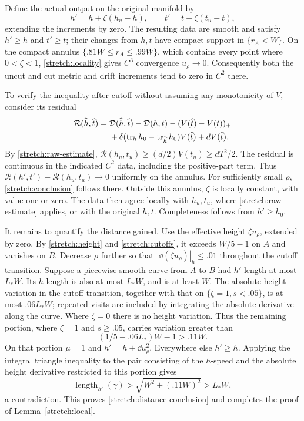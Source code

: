Define the actual output on the original manifold by
\begin{equation}\label{stretch:output}
 h'=h+\zeta(h_u-h),\qquad t'=t+\zeta(t_u-t),
\end{equation}
extending the increments by zero.  The resulting data are smooth and
satisfy $h'\ge h$ and $t'\ge t$; their changes from $h,t$ have compact
support in $\{r_A<W\}$.
On the compact annulus
$\{.81W\le r_A\le.99W\}$, which contains every point where
$0<\zeta<1$, \eqref{stretch:locality} gives $C^3$ convergence
$u_\rho\to0$.  Consequently both the uncut and cut metric and drift
increments tend to zero in $C^2$ there.

To verify the inequality after cutoff without assuming any monotonicity
of $V$, consider its residual
\[
 \begin{split}
 \mathcal R(\widehat h,\widehat t)={}&
 \mathcal D(\widehat h,\widehat t)-\mathcal D(h,t)
                         -(V(\widehat t)-V(t))_+\\
 &+\delta(\operatorname{tr}_hh_0-\operatorname{tr}_{\widehat h}h_0)V(\widehat t)
                                      +dV(\widehat t).
 \end{split}
\]
By \eqref{stretch:raw-estimate},
$\mathcal R(h_u,t_u)\ge(d/2)V(t_u)\ge dT^2/2$.
The residual is continuous in the indicated $C^2$ data, including the
positive-part term.  Thus
$\mathcal R(h',t')-\mathcal R(h_u,t_u)\to0$ uniformly on the annulus.
For sufficiently small $\rho$, \eqref{stretch:conclusion} follows
there.  Outside this annulus, $\zeta$ is locally constant, with value
one or zero.  The data then agree locally with $h_u,t_u$, where
\eqref{stretch:raw-estimate} applies, or with the original $h,t$.
Completeness follows from $h'\ge h_0$.

It remains to quantify the distance gained.  Use the effective height
$\zeta u_\rho$, extended by zero.  By \eqref{stretch:height} and
\eqref{stretch:cutoffs}, it exceeds $W/5-1$ on $A$ and vanishes on $B$.
Decrease $\rho$ further so that
$|\dd(\zeta u_\rho)|_h\le.01$ throughout the cutoff transition.
Suppose a piecewise smooth curve from $A$ to $B$ had $h'$-length at most
$L_*W$.  Its $h$-length is also at most $L_*W$, and is at least $W$.
The absolute height variation in the cutoff transition, together with
that on $\{\zeta=1,s<.05\}$, is at most $.06L_*W$; repeated visits
are included by integrating the absolute derivative along the curve.
Where $\zeta=0$ there is no height variation.  Thus the remaining
portion, where $\zeta=1$ and $s\ge.05$, carries variation greater than
\[
 (1/5-.06L_*)W-1>.11W.
\]
On that portion $\mu=1$ and $h'=h+\dd u_\rho^2$.  Everywhere else
$h'\ge h$.  Applying the integral triangle inequality to the pair
consisting of the $h$-speed and the absolute height derivative restricted
to this portion gives
\[
 \operatorname{length}_{h'}(\gamma)
 >\sqrt{W^2+(.11W)^2}>L_*W,
\]
a contradiction.  This proves \eqref{stretch:distance-conclusion} and
completes the proof of Lemma~\ref{stretch:local}.

